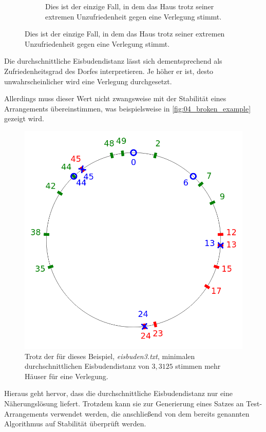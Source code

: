 \documentclass[a4paper,10pt,ngerman]{scrartcl}
\newcommand{\imageWidth}{0.3\linewidth}
\begin{document}
\begin{figure}[ht]
\begin{subfigure}[t]{\imageWidth}
        \caption{Dies ist der einzige Fall, in dem das Haus trotz seiner extremen Unzufriedenheit gegen eine Verlegung stimmt.}
        \label{fig:03_slightly_happy_house}
    \end{subfigure}
\end{figure}
Die durchschnittliche Eisbudendistanz lässt sich dementsprechend als \glqq Zufriedenheitsgrad\grqq{} des Dorfes interpretieren.
Je höher er ist, desto unwahrscheinlicher wird eine Verlegung durchgesetzt.

Allerdings muss dieser Wert nicht zwangsweise mit der Stabilität eines Arrangements übereinstimmen, was beispielsweise in \autoref{fig:04_broken_example} gezeigt wird.
\begin{figure}[ht]
    \centering
    \includegraphics[width=\imageWidth]{04_broken_example.png}
    \caption{Trotz der für dieses Beispiel, \textit{eisbuden3.txt}, minimalen durchschnittlichen Eisbudendistanz von $3,3125$ stimmen mehr Häuser für eine Verlegung.}
    \label{fig:04_broken_example}
\end{figure}
Hieraus geht hervor, dass die durchschnittliche Eisbudendistanz nur eine Näherungslösung liefert.
Trotzdem kann sie zur Generierung eines Satzes an Test-Arrangements verwendet werden, die anschließend von dem bereits genannten Algorithmus auf Stabilität überprüft werden.
\end{document}
